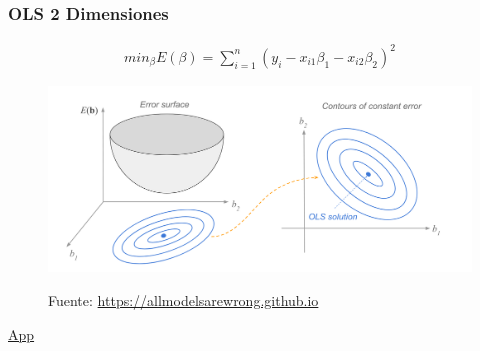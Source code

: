 \documentclass[
  shownotes,
  xcolor={svgnames},
  hyperref={colorlinks,citecolor=DarkBlue,linkcolor=andesred,urlcolor=DarkBlue}
  , aspectratio=169]{beamer}
\begin{document}
\begin{frame}[fragile]
\frametitle{OLS 2 Dimensiones}
\footnotesize
\begin{align}
min_{\beta} E(\beta) = \sum_{i=1}^n (y_i - x_{i1}\beta_1-x_{i2}\beta_2)^2 
\end{align}
\begin{figure}[H] \centering
            \captionsetup{justification=centering}
              \includegraphics[scale=0.4]{figures/ols1}
 
\tiny
Fuente: \url{https://allmodelsarewrong.github.io}
\end{figure}

\href{https://cede.uniandes.edu.co/OLS/}{App}
\end{frame}
\end{document}
